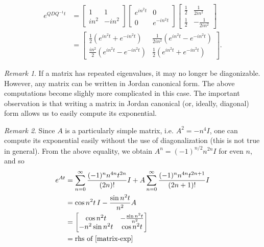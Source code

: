 \documentclass[12pt,reqno]{amsart}
\numberwithin{equation}{section}  %
\numberwithin{figure}{section}
\theoremstyle{plain}
\theoremstyle{definition}
\theoremstyle{remark}
\newtheorem{remark}{Remark}
\begin{document}
\begin{equation}
  \label{matrix-exp}
\begin{split}
  e^{Q D Q^{-1}t}
  & = 
\begin{bmatrix}
  1 & 1
  \\
  in^{2} & -in^{2}
  \end{bmatrix}
  \begin{bmatrix}
    e^{in^{2}t} & 0 
    \\
    0 & e^{-in^{2}t}
  \end{bmatrix}
\begin{bmatrix}
    \frac{1}{2} & \frac{1}{2i n^{2}} \\
    \frac{1}{2} & -\frac{1}{2i n^{2} }
  \end{bmatrix}
  \\
  & =
  \begin{bmatrix}
    \frac{1}{2}(e^{in^{2}t} + e^{-in^{2}t}) & \frac{1}{2 i n^{2}} (e^{in^{2}t} -
    e^{-in^{2}t})    \\
    \frac{in^{2}}{2}(e^{in^{2}t} - e^{-in^{2}t}) & \frac{1}{2}(e^{in^{2}t} +
    e^{-in^{2}t})
  \end{bmatrix}.
\end{split}
\end{equation}
%
%
\begin{framed}
\begin{remark}
If a matrix has repeated eigenvalues, it may no longer be diagonizable. However,
any matrix can be written in Jordan canonical form. The above computations
become slighly more complicated in this case. The important observation is that
writing a matrix in Jordan canonical (or, ideally, diagonal) form allows us to
easily compute its exponential. 
\label{rem:jordan-form}
\end{remark}
\end{framed}
%
%
%
%
\begin{framed}
\begin{remark}
  Since $A$ is a particularly simple matrix, i.e. $A^{2} = -n^{4} I$, one can
  compute its exponential easily without the use of diagonalization (this is
  not true in general). From the above equality, we obtain $A^{n} =
  (-1)^{n/2} n^{2n} I$ for even $n$, and so
  \begin{equation*}
  \begin{split}
    e^{At}
    & = \sum_{n=0}^{\infty} \frac{(-1)^{n}n^{4n}t^{2n}}{(2n)!}I + A
    \sum_{n=0}^{\infty} \frac{(-1)^{n} n^{4n} t^{2n + 1}}{(2n + 1)!} I 
    \\
    & = \cos n^{2}t \, I - \frac{\sin n^{2}t}{n^{2}}A
    \\
    & = 
    \begin{bmatrix}
      \cos n^{2}t &  -\frac{\sin n^{2}t}{n^{2}}
      \\
      - n^{2} \sin n^{2}t & \cos n^{2}t
    \end{bmatrix}
    \\
    & = \text{rhs of }\eqref{matrix-exp}
  \end{split}
  \end{equation*}
\label{rem:simpler-comp}
\end{remark}
\end{framed}
\end{document}
